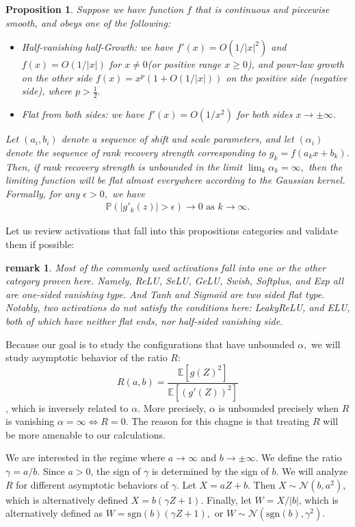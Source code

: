 \documentclass[11pt]{article}
\newtheorem{remark}{remark}
\newtheorem{proposition}{Proposition}
\renewcommand{\P}{\mathbb{P}}
\begin{document}
\begin{proposition}
    Suppose we have function $f$ that is continuous and piecewise smooth,  and obeys one of the following:
    \begin{itemize}
        \item Half-vanishing half-Growth: we have  $f'(x) = O(1/|x|^2)$ and $f(x) = O(1/|x|)$ for $x\ne 0 $(or positive range $x\ge 0$), and powr-law growth on the other side $f(x) = x^p ( 1 + O(1/|x|))$  on the positive side (negative side), where $p > \frac12.$
        \item Flat from both sides: we have $f'(x) = O(1/x^2) $ for both sides $x\to\pm\infty.$
    \end{itemize}
    Let  $(a_i,b_i)$ denote a sequence of shift and scale parameters, and let $(\alpha_i)$ denote the sequence of rank recovery strength corresponding to $g_k = f(a_k x + b_k).$  Then, if rank recovery strength is unbounded in the limit $\lim_k\alpha_k = \infty, $ then the limiting function will be flat almost everywhere according to the Gaussian kernel. Formally, for any $\epsilon>0,$ we have 
    \begin{align*}
        \P(|g'_k(z)|>\epsilon) \to 0 \text{ as } k\to \infty. 
    \end{align*}
\end{proposition}

Let us review activations that fall into this propositions categories and validate them if possible:

\begin{remark}
    Most of the commonly used activations fall into one or the other category proven here. Namely, ReLU, SeLU, GeLU, Swish, Softplus, and Exp all are one-sided vanishing type. And Tanh and Sigmoid are two sided flat type. Notably, two activations do not satisfy the conditions here: LeakyReLU, and ELU, both of which have neither flat ends, nor half-sided vanishing side. 
\end{remark}


Because our goal is to study the configurations that have unbounded $\alpha,$ we will study  asymptotic behavior of the ratio $R$:
$$R(a,b) = \frac{\mathbb{E}[g(Z)^2]}{\mathbb{E}[(g'(Z))^2]} $$, which is inversely related to $\alpha. $ More precisely, $\alpha$ is unbounded precisely when $R$ is vanishing $\alpha = \infty \iff R = 0. $ The reason for this chagne is that treating $R$ will be more amenable to our calculations. 

We are interested in the regime where $a \to \infty$ and $b \to \pm\infty$. We define the ratio $\gamma = a/b$. Since $a>0$, the sign of $\gamma$ is determined by the sign of $b$. We will analyze $R$ for different asymptotic behaviors of $\gamma$.  Let $X = aZ+b$. Then $X \sim \mathcal{N}(b, a^2)$, which is alternatively defined  $X = b(\gamma Z + 1)$. Finally, let $W = X/|b|$, which is alternatively defined as $W = \text{sgn}(b)(\gamma Z + 1),$ or $W \sim \mathcal{N}(\text{sgn}(b), \gamma^2)$.  
\end{document}
